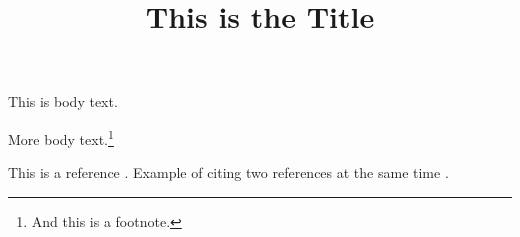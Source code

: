 \documentclass[11pt,a4paper]{article}
\title{This is the Title}
\begin{document}
\makeheader


This is body text.


More body text.\footnote{And this is a footnote.}

\newpage

This is a reference \cite{Frank2017}. Example of citing two
references at the same time \cite{George1999, Yudkowsky2007}.

\makeworkscited
\end{document}
